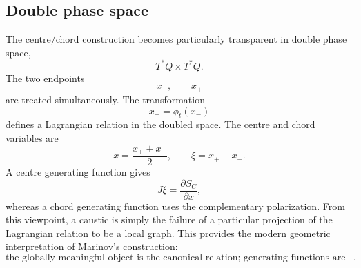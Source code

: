 \subsection{Double phase space}
The centre/chord construction becomes particularly transparent in double
phase space,
\begin{equation}
 T^*Q\times T^*Q.
\end{equation}
The two endpoints
\begin{equation}
 x_-,\qquad x_+
\end{equation}
are treated simultaneously.  The transformation
\begin{equation}
 x_+\!=\phi_t(x_-)
\end{equation}
defines a Lagrangian relation in the doubled space.
The centre and chord variables are
\begin{equation}
 x=\frac{x_++x_-}{2},
 \qquad
 \xi=x_+-x_-.
\end{equation}
A centre generating function gives
\begin{equation}
 J\xi=\frac{\partial S_C}{\partial x},
\end{equation}
whereas a chord generating function uses the complementary polarization.
From this viewpoint, a caustic is simply the failure of a particular
projection of the Lagrangian relation to be a local graph.
This provides the modern geometric interpretation of Marinov's construction:
\begin{equation}
 \boxed{
 \text{the globally meaningful object is the canonical relation;
 generating functions are local representations of it}.
 }
\end{equation}
